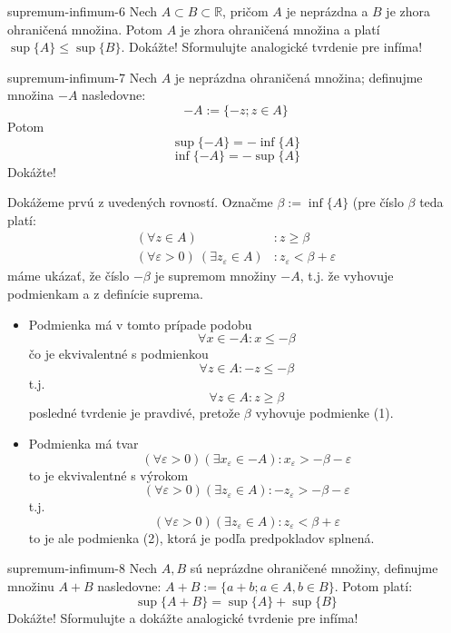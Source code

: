 \begin{defproblem}{supremum-infimum-6}
Nech $A \subset B \subset \mathbb{R}$, pričom $A$ je neprázdna a $B$ je zhora
ohraničená množina. Potom $A$ je zhora ohraničená množina a platí
$\sup\{A\} \leq \sup\{B\}$. Dokážte! Sformulujte analogické tvrdenie pre infíma!
\end{defproblem}

\begin{defproblem}{supremum-infimum-7}
Nech $A$ je neprázdna ohraničená množina; definujme množina $-A$ nasledovne:
$$-A := \{ -z; z \in A\}$$
Potom
$$\sup\{-A\} = -\inf\{A\}$$
$$\inf\{-A\} = -\sup\{A\}$$
Dokážte!

\begin{solution}
  Dokážeme prvú z uvedených rovností. Označme $\beta := \inf\{A\}$ (pre číslo
  $\beta$ teda platí:
  \begin{align*}
    (\forall z \in A)&: z \geq \beta \\
    (\forall \varepsilon > 0) \: (\exists z_\varepsilon \in A)&:
            z_\varepsilon < \beta + \varepsilon
  \end{align*}
  máme ukázať, že číslo $-\beta$ je supremom množiny $-A$, t.j. že vyhovuje
  podmienkam  a  z definície suprema.

  \begin{itemize}
    \item[\ding{34}]
      Podmienka má v tomto prípade podobu
      $$\forall x \in -A: x \leq -\beta$$
      čo je ekvivalentné s podmienkou
      $$\forall z \in A: -z \leq -\beta$$
      t.j.
      $$\forall z \in A: z \geq \beta$$
      posledné tvrdenie je pravdivé, pretože $\beta$ vyhovuje
      podmienke (1).
    \item[\ding{37}]
      Podmienka má tvar
      $$(\forall \varepsilon > 0) (\exists x_\varepsilon \in -A):
        x_\varepsilon > -\beta - \varepsilon$$
      to je ekvivalentné s výrokom
      $$(\forall \varepsilon > 0) (\exists z_\varepsilon \in A):
        -z_\varepsilon > -\beta - \varepsilon$$
      t.j.
      $$(\forall \varepsilon > 0) (\exists z_\varepsilon \in A):
        z_\varepsilon < \beta + \varepsilon$$
      to je ale podmienka (2), ktorá je podľa predpokladov splnená.
  \end{itemize}
\end{solution}

\end{defproblem}

\begin{defproblem}{supremum-infimum-8}
Nech $A, B$ sú neprázdne ohraničené množiny, definujme množinu $A + B$
nasledovne: $A + B := \{ a + b ; a \in A, b \in B \}$. Potom platí:
$$\sup\{A + B\} = \sup\{A\} + \sup\{B\}$$
Dokážte! Sformulujte a dokážte analogické tvrdenie pre infíma!
\end{defproblem}

